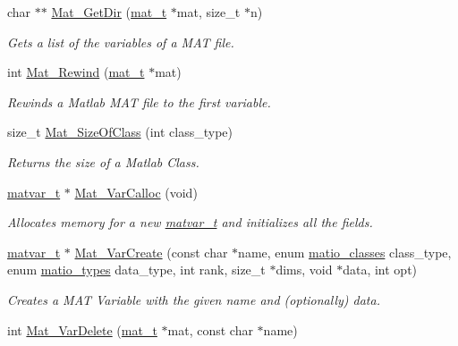 \begin{DoxyCompactItemize}
char $\ast$$\ast$ \hyperlink{group___m_a_t_ga7c0d94860d782366ab93d9b6b068eaea}{Mat\+\_\+\+Get\+Dir} (\hyperlink{group___m_a_t_gab0fc888f5a5d79943b16284b1f91c2e8}{mat\+\_\+t} $\ast$mat, size\+\_\+t $\ast$n)
\begin{DoxyCompactList}\small\item\em Gets a list of the variables of a M\+AT file. \end{DoxyCompactList}\item 
int \hyperlink{group___m_a_t_ga4d6e3892d2e216c507a744ba0e070d0b}{Mat\+\_\+\+Rewind} (\hyperlink{group___m_a_t_gab0fc888f5a5d79943b16284b1f91c2e8}{mat\+\_\+t} $\ast$mat)
\begin{DoxyCompactList}\small\item\em Rewinds a Matlab M\+AT file to the first variable. \end{DoxyCompactList}\item 
size\+\_\+t \hyperlink{group___m_a_t_ga2bf682f015b22fa796a8885e997661e7}{Mat\+\_\+\+Size\+Of\+Class} (int class\+\_\+type)
\begin{DoxyCompactList}\small\item\em Returns the size of a Matlab Class. \end{DoxyCompactList}\item 
\hyperlink{group___m_a_t_structmatvar__t}{matvar\+\_\+t} $\ast$ \hyperlink{group___m_a_t_gae7c9c3699f6e9c31a9c490300013098c}{Mat\+\_\+\+Var\+Calloc} (void)
\begin{DoxyCompactList}\small\item\em Allocates memory for a new \hyperlink{group___m_a_t_structmatvar__t}{matvar\+\_\+t} and initializes all the fields. \end{DoxyCompactList}\item 
\hyperlink{group___m_a_t_structmatvar__t}{matvar\+\_\+t} $\ast$ \hyperlink{group___m_a_t_ga1c54a84bb4d810c6fccdb8869489eac4}{Mat\+\_\+\+Var\+Create} (const char $\ast$name, enum \hyperlink{group___m_a_t_gad4d60ae7b709fc81bfd744fb4c857c40}{matio\+\_\+classes} class\+\_\+type, enum \hyperlink{group___m_a_t_gacf7b3b879282b7ab3a51190e49bf3453}{matio\+\_\+types} data\+\_\+type, int rank, size\+\_\+t $\ast$dims, void $\ast$data, int opt)
\begin{DoxyCompactList}\small\item\em Creates a M\+AT Variable with the given name and (optionally) data. \end{DoxyCompactList}\item 
int \hyperlink{group___m_a_t_gabf139e48d48177e5069338fa2919c60a}{Mat\+\_\+\+Var\+Delete} (\hyperlink{group___m_a_t_gab0fc888f5a5d79943b16284b1f91c2e8}{mat\+\_\+t} $\ast$mat, const char $\ast$name)
$$
\end{DoxyCompactItemize}
